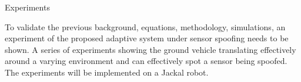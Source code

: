 
\begin{section}{Experiments}
\label{sec:experiment}

To validate the previous background, equations, methodology, simulations, an experiment of the proposed adaptive system under sensor spoofing needs to be shown. A series of experiments showing the ground vehicle translating effectively around a varying environment and can effectively spot a sensor being spoofed. The experiments will be implemented on a Jackal robot.



\end{section}